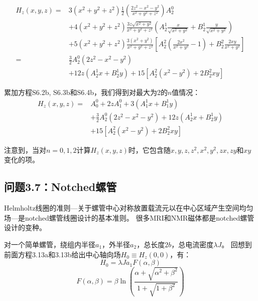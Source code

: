 \begin{equation*}%
\begin{split}
H_z(x,y,z)=&3(x^2+y^2+z^2)\frac{1}{2}\left(\frac{2z^2-x^2-y^2}{x^2+y^2+z^2}\right)A_{2}^{0}\\
&+4(x^2+y^2+z^2)\frac{3z\sqrt{x^2+y^2}}{x^2+y^2+z^2}
\left(A_{2}^{1}\frac{x}{\sqrt{x^2+y^2}}+B_{2}^{1}\frac{y}{\sqrt{x^2+y^2}}\right)\\
&+5(x^2+y^2+z^2)\frac{3(x^2+y^2)}{x^2+y^2+z^2}\left[A_{2}^{2}(\frac{2x^2}{x^2+y^2}-1)+B_{2}^{2}\frac{2xy}{x^2+y^2}\right]\\
=&\frac{3}{2}A_{2}^{0}(2z^2-x^2-y^2)\\
&+12z(A_{2}^{1}x+B_{2}^{1}y)+15[A_{2}^{2}(x^2-y^2)+2B_{2}^{2}xy]
\end{split}\tag{S6.4b}
\end{equation*}

累加方程S6.2b, S6.3b和S6.4b，我们得到对最大为2的$n$值情况：
\begin{equation*}%
\begin{split}
H_z(x,y,z)=&A_{0}^{0}+2zA_{1}^{0}+3(A_{1}^{1}x+B_{1}^{1}y)\\
&+\frac{3}{2}A_{2}^{0}(2z^2-x^2-y^2)+12z(A_{2}^{1}x+B_{2}^{1}y)\\
&+15[A_{2}^{2}(x^2-y^2)+2B_{2}^{2}xy]
\end{split}\tag{3.126c}
\end{equation*}

注意到，当对$n=0,1,2$计算$H_z(x, y, z)$时，它包含随$x, y, z, z^2, x^2, y^2, zx, zy$和$xy$变化的项。


\subsection{问题3.7：Notched螺管}
Helmholtz线圈的准则---关于螺管中心对称放置载流元以在中心区域产生空间均匀场---是notched螺管线圈设计的基本准则。
很多MRI和NMR磁体都是notched螺管设计的变种。

对一个简单螺管，绕组内半径$a_1$，外半径$a_2$，总长度$2b$，总电流密度$\lambda J$。
回想到前面方程3.13a和3.13b给出中心轴向场$H_0\equiv H_z(0, 0)$，有：
 \begin{equation*}%
H_0=\lambda Ja_1F(\alpha,\beta) \tag{3.13a}
\end{equation*}
\begin{equation*}%
F(\alpha,\beta)=\beta\ln\left(\frac{\alpha+\sqrt{\alpha^2+\beta^2}}{1+\sqrt{1+\beta^2}}\right)\tag{3.13b}
\end{equation*}

